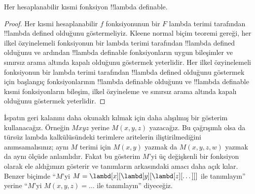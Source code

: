 \documentclass[../../../include/open-logic-section]{subfiles}
\begin{document}

\begin{thm}
Her hesaplanabilir kısmi fonksiyon !!{lambda definable}.
\end{thm}

\begin{proof}
Her kısmi hesaplanabilir $f$ fonksiyonunun bir $F$ lambda terimi tarafından
!!{lambda defined} olduğunu göstermeliyiz. Kleene normal biçim teoremi
gereği, her ilkel özyinelemeli fonksiyonun bir lambda terimi tarafından
!!{lambda defined} olduğunu ve ardından !!{lambda definable} fonksiyonların
uygun bileşimler ve sınırsız arama altında kapalı olduğunu göstermek
yeterlidir. Her ilkel özyinelemeli fonksiyonun bir lambda terimi tarafından
!!{lambda defined} olduğunu göstermek için başlangıç fonksiyonlarının
!!{lambda definable} olduğunu ve !!{lambda definable} kısmi fonksiyonların
bileşim, ilkel özyineleme ve sınırsız arama altında kapalı olduğunu
göstermek yeterlidir.
\end{proof}

İspatın geri kalanını daha okunaklı kılmak için daha alışılmış bir gösterim
kullanacağız. Örneğin $Mxyz$ yerine $M(x,y,z)$ yazacağız. Bu çağrışımlı olsa
da türsüz lambda kalkülüsündeki terimlere aritelerin iliştirilmediğini
anımsamalısınız; aynı $M$ terimi için $M(x,y)$ yazmak da $M(x,y,z,w)$ yazmak
da aynı ölçüde anlamlıdır. Fakat bu gösterim $M$'yi üç değişkenli bir
fonksiyon olarak ele aldığımızı gösterir ve tanımların arkasındaki amacı
daha açık kılar. Benzer biçimde ``$M$'yi
$M=\lambd[x][\lambd[y][\lambd[z][\dots]]]$ ile tanımlayın'' yerine
``$M$'yi $M(x,y,z)=\dots$ ile tanımlayın'' diyeceğiz.
\end{document}

